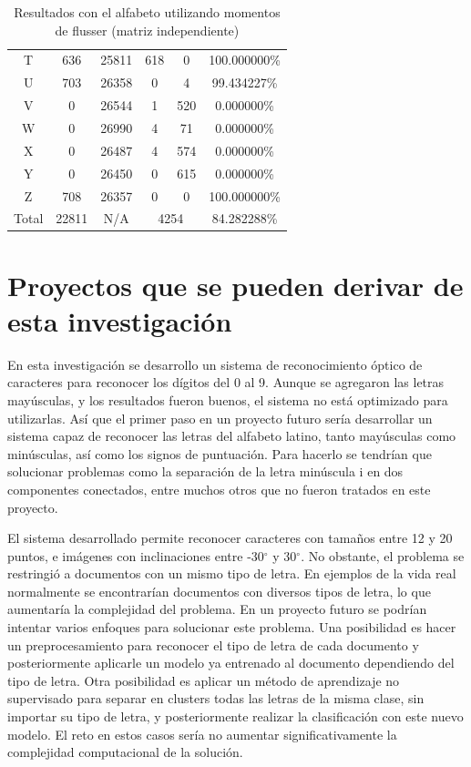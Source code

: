 \documentclass[a4paper, 11pt, oneside]{report}
\begin{document}
\begin{table}
\begin{tabular}{|c|c|c|c|c|c|}
	T & 636 & 25811 & 618 & 0 & 100.000000\% \\ 
	U & 703 & 26358 & 0 & 4 & 99.434227\% \\ 
	V & 0 & 26544 & 1 & 520 & 0.000000\% \\ 
	W & 0 & 26990 & 4 & 71 & 0.000000\% \\ 
	X & 0 & 26487 & 4 & 574 & 0.000000\% \\ 
	Y & 0 & 26450 & 0 & 615 & 0.000000\% \\ 
	Z & 708 & 26357 & 0 & 0 & 100.000000\% \\ 
	\hline
	Total & 22811 & N/A & \multicolumn{2}{|c|}{4254} & 84.282288\% \\
	\hline
\end{tabular}
\caption{Resultados con el alfabeto utilizando momentos de flusser (matriz independiente)}
\label{tb:alphaRotIndep}
\end{table}

\section{Proyectos que se pueden derivar de esta investigación}

En esta investigación se desarrollo un sistema de reconocimiento óptico de caracteres para reconocer los dígitos del 0 al 9. Aunque se agregaron las letras mayúsculas, y los resultados fueron buenos, el sistema no está optimizado para utilizarlas. Así que el primer paso en un proyecto futuro sería desarrollar un sistema capaz de reconocer las letras del alfabeto latino, tanto mayúsculas como minúsculas, así como los signos de puntuación. Para hacerlo se tendrían que solucionar problemas como la separación de la letra minúscula i en dos componentes conectados, entre muchos otros que no fueron tratados en este proyecto.

El sistema desarrollado permite reconocer caracteres con tamaños entre 12 y 20 puntos, e imágenes con inclinaciones entre -30$^{\circ}$ y 30$^{\circ}$. No obstante, el problema se restringió a documentos con un mismo tipo de letra. En ejemplos de la vida real normalmente se encontrarían documentos con diversos tipos de letra, lo que aumentaría la complejidad del problema. En un proyecto futuro se podrían intentar varios enfoques para solucionar este problema. Una posibilidad es hacer un preprocesamiento para reconocer el tipo de letra de cada documento y posteriormente aplicarle un modelo ya entrenado al documento dependiendo del tipo de letra. Otra posibilidad es aplicar un método de aprendizaje no supervisado para separar en clusters todas las letras de la misma clase, sin importar su tipo de letra, y posteriormente realizar la clasificación con este nuevo modelo. El reto en estos casos sería no aumentar significativamente la complejidad computacional de la solución.
\end{document}
